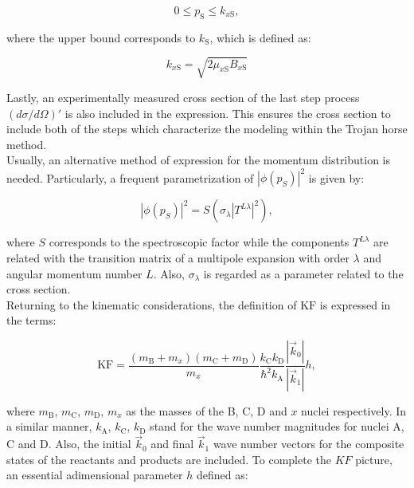 \documentclass[openany]{book}
\begin{document}
\begin{equation}\label{eq:special_THM_momentum_inequality}
	0 \le p_\mathrm{S} \le k_{x\mathrm{S}},
\end{equation}

where the upper bound corresponds to $k_{\mathrm{S}}$, which is defined as: 

\begin{equation}\label{eq:special_THM_momentum_max}
	k_{x\mathrm{S}} = \sqrt{2 \mu_{x\mathrm{S}}  B_{x\mathrm{S}}}
\end{equation}

Lastly, an experimentally measured cross section of the last step process $(d\sigma/d\Omega)'$ is also included in the expression. This ensures the cross section to include both of the steps which characterize the modeling within the Trojan horse method.  \\

Usually, an alternative method of expression for the momentum distribution is needed. Particularly, a frequent parametrization of $|\phi(p_S)|^2$ is given by:

\begin{equation}\label{eq:special_THM_momentumDistribution}
	|\phi(p_S)|^2  = S (\sigma_{\lambda} |T^{L \lambda}|^2 ),
\end{equation}

where $S$ corresponds to the spectroscopic factor while the components $T^{L\lambda}$ are related with the transition matrix of a multipole expansion with order $\lambda$ and angular momentum number $L$. Also, $\sigma_\lambda$ is regarded as a parameter related to the cross section. \\

Returning to the kinematic considerations, the definition of   $\mathrm{KF}$ is expressed in the terms: 

\begin{equation}\label{eq:special_THM_kinematicFactor}
	\mathrm{KF} = \frac{(m_\mathrm{B} + m_x)(m_\mathrm{C} + m_\mathrm{D})}{m_x} \frac{k_\mathrm{C} k_\mathrm{D}}{\hbar^2 k_\mathrm{A}} \frac{|\vec k_0|}{|\vec k_1|} h,
\end{equation}

where $m_{\mathrm{B}}$,  $m_{\mathrm{C}}$,  $m_{\mathrm{D}}$, $m_x$ as the masses of the B, C, D and $x$ nuclei respectively. In a similar manner, $k_\mathrm{A}$,  $k_\mathrm{C}$, $k_\mathrm{D}$ stand for the wave number magnitudes for nuclei A, C and D. Also, the initial $\vec k_0$ and final $\vec k_1$ wave number vectors for the composite states of the reactants and products are included. To complete the $KF$ picture, an essential adimensional parameter $h$  defined as: 
\end{document}
